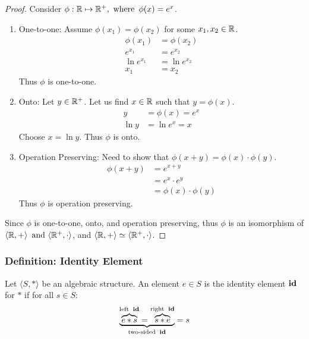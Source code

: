\begin{proof}
    Consider $\phi: \mathbb{R} \mapsto \mathbb{R}^+, \operatorname{~\text{where}~} \phi(x) = e^x$.
    \begin{enumerate}
        \item One-to-one: Assume $\phi(x_1) = \phi(x_2)$ for some $x_1,x_2 \in \mathbb{R}$.
              \begin{align*}
                  \phi(x_1)   & = \phi(x_2)   \\
                  e^{x_1}     & = e^{x_2}     \\
                  \ln e^{x_1} & = \ln e^{x_2} \\
                  x_1         & = x_2
              \end{align*}
              Thus $\phi$ is one-to-one.
        \item Onto: Let $y \in \mathbb{R}^+$. Let us find $x \in \mathbb{R}$ such that $y = \phi(x)$.
              \begin{align*}
                  y     & = \phi(x) = e^x \\
                  \ln y & = \ln e^x = x
              \end{align*}
              Choose $x = \ln y$. Thus $\phi$ is onto.
        \item Operation Preserving: Need to show that $\phi(x + y) = \phi(x) \cdot \phi(y)$.
              \begin{align*}
                  \phi(x+y) & = e^{x+y}               \\
                            & = e^x \cdot e^y         \\
                            & = \phi(x) \cdot \phi(y)
              \end{align*}
              Thus $\phi$ is operation preserving.
    \end{enumerate}
    Since $\phi$ is one-to-one, onto, and operation preserving, thus $\phi$ is an isomorphism of $\langle \mathbb{R},+\rangle \operatorname{~\text{and}~} \langle \mathbb{R}^+, \cdot \rangle$, and $\langle \mathbb{R},+\rangle \simeq \langle \mathbb{R}^+, \cdot \rangle$.
\end{proof}

\subsubsection*{Definition: Identity Element}
Let $\langle S, * \rangle$ be an algebraic structure. An element $e \in S$ is the identity element $\operatorname{\textbf{id}}$ for $*$ if for all $s \in S$:
\[
    \underbrace{\overbrace{e * s}^{\text{left}~\operatorname{\textbf{id}}} = \overbrace{s * e}^{\text{right}~\operatorname{\textbf{id}}}}_{\text{two-sided}~\operatorname{\textbf{id}}} = s
\]

